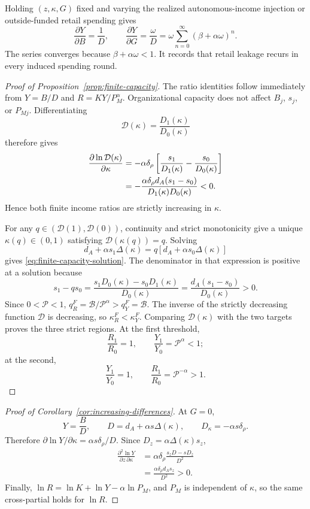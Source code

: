 Holding \((z,\kappa,G)\) fixed and varying the realized autonomous-income
injection or outside-funded retail spending gives
\[
 \frac{\partial Y}{\partial B}=\frac1D,
 \qquad
 \frac{\partial Y}{\partial G}=\frac{\omega}{D}
 =\omega\sum_{n=0}^{\infty}(\beta+\alpha\omega)^n.
\]
The series converges because \(\beta+\alpha\omega<1\). It records that retail
leakage recurs in every induced spending round.

\begin{proof}[Proof of Proposition~\ref{prop:finite-capacity}]
The ratio identities follow immediately from \(Y=B/D\) and
\(R=KY/P_M^\alpha\). Organizational capacity does not affect \(B_j\),
\(s_j\), or \(P_{Mj}\). Differentiating
\[
 \mathcal D(\kappa)=\frac{D_1(\kappa)}{D_0(\kappa)}
\]
therefore gives
\begin{align}
 \frac{\partial\ln\mathcal D(\kappa)}{\partial\kappa}
 &=-\alpha\delta_\rho
 \left[\frac{s_1}{D_1(\kappa)}-
       \frac{s_0}{D_0(\kappa)}\right] \notag\\
 &=-\frac{\alpha\delta_\rho d_A(s_1-s_0)}
 {D_1(\kappa)D_0(\kappa)}<0.
 \label{eq:finite-capacity-monotonicity-proof}
\end{align}
Hence both finite income ratios are strictly increasing in \(\kappa\).

For any \(q\in(\mathcal D(1),\mathcal D(0))\), continuity and strict
monotonicity give a unique \(\kappa(q)\in(0,1)\) satisfying
\(\mathcal D(\kappa(q))=q\). Solving
\[
 d_A+\alpha s_1\Delta(\kappa)
 =q[d_A+\alpha s_0\Delta(\kappa)]
\]
gives \eqref{eq:finite-capacity-solution}. The denominator in that expression
is positive at a solution because
\[
 s_1-qs_0
 =\frac{s_1D_0(\kappa)-s_0D_1(\kappa)}{D_0(\kappa)}
 =\frac{d_A(s_1-s_0)}{D_0(\kappa)}>0.
\]
Since \(0<\mathcal P<1\),
\(q_R^F=\mathcal B/\mathcal P^\alpha>q_Y^F=\mathcal B\). The inverse of the
strictly decreasing function \(\mathcal D\) is decreasing, so
\(\kappa_R^F<\kappa_Y^F\). Comparing \(\mathcal D(\kappa)\) with the two
targets proves the three strict regions. At the first threshold,
\[
 \frac{R_1}{R_0}=1,\qquad
 \frac{Y_1}{Y_0}=\mathcal P^\alpha<1;
\]
at the second,
\[
 \frac{Y_1}{Y_0}=1,\qquad
 \frac{R_1}{R_0}=\mathcal P^{-\alpha}>1.
\]
\end{proof}

\begin{proof}[Proof of Corollary~\ref{cor:increasing-differences}]
At \(G=0\),
\[
 Y=\frac{B}{D},\qquad
 D=d_A+\alpha s\Delta(\kappa),\qquad
 D_\kappa=-\alpha s\delta_\rho.
\]
Therefore \(\partial\ln Y/\partial\kappa=\alpha s\delta_\rho/D\). Since
\(D_z=\alpha\Delta(\kappa)s_z\),
\begin{align}
 \frac{\partial^2\ln Y}{\partial z\,\partial\kappa}
 &=\alpha\delta_\rho
 \frac{s_zD-sD_z}{D^2} \\
 &=\frac{\alpha\delta_\rho d_A s_z}{D^2}>0.
\end{align}
Finally, \(\ln R=\ln K+\ln Y-\alpha\ln P_M\), and \(P_M\) is independent
of \(\kappa\), so the same cross-partial holds for \(\ln R\).
\end{proof}

